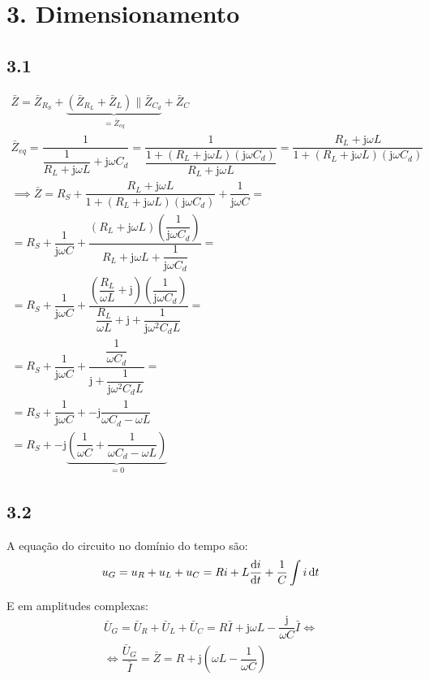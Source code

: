 \documentclass[a4paper, titlepage, portuguese]{article}
\newcommand{\eq}{\Leftrightarrow} %
\begin{document}
	\section{3. Dimensionamento}
	\subsection{3.1}
		\begin{gather*}
			\bar{Z} = \bar{Z}_{R_S} + \underbrace{(\bar{Z}_{R_L} + \bar{Z}_{L}) \parallel \bar{Z}_{C_d}}_{= \bar{Z}_{eq}} + \bar{Z}_C \\
			\bar{Z}_{eq} = \dfrac{1}{\dfrac{1}{R_L + \mathrm{j} \omega L} + \mathrm{j} \omega C_d} =
			\dfrac{1}{\dfrac{1 + (R_L + \mathrm{j} \omega L)(\mathrm{j} \omega C_d)}{R_L + \mathrm{j} \omega L}} =
			\dfrac{R_L + \mathrm{j} \omega L}{1 + (R_L + \mathrm{j} \omega L)(\mathrm{j} \omega C_d)} \\
			\implies \bar{Z} = R_S + \dfrac{R_L + \mathrm{j} \omega L}{1 + (R_L + \mathrm{j} \omega L)(\mathrm{j} \omega C_d)} + \dfrac{1}{\mathrm{j} \omega C} = \\
			= R_S + \dfrac{1}{\mathrm{j} \omega C} + \dfrac{\left(R_L + \mathrm{j} \omega L\right)\left(\dfrac{1}{\mathrm{j} \omega C_d}\right)}{R_L + \mathrm{j} \omega L + \dfrac{1}{\mathrm{j} \omega C_d}} = \\
			= R_S + \dfrac{1}{\mathrm{j} \omega C} + \dfrac{\left(\dfrac{R_L}{\omega L} + \mathrm{j}\right)\left(\dfrac{1}{\mathrm{j} \omega C_d}\right)}{\dfrac{R_L}{\omega L} + \mathrm{j} + \dfrac{1}{\mathrm{j} \omega^2 C_d L}} = \\
			= R_S + \dfrac{1}{\mathrm{j} \omega C} + \dfrac{\dfrac{1}{\omega C_d}}{\mathrm{j} + \dfrac{1}{\mathrm{j} \omega^2 C_d L}} = \\
			= R_S + \dfrac{1}{\mathrm{j} \omega C} + -\mathrm{j}\dfrac{1}{\omega C_d - \omega L} \\
			= R_S + -\mathrm{j}\underbrace{\left(\dfrac{1}{\omega C} + \dfrac{1}{\omega C_d - \omega L}\right)}_{= 0}
		\end{gather*}
	\subsection{3.2}
		\par
		A equação do circuito no domínio do tempo são:
		\begin{gather*}
			u_G = u_R + u_L + u_C = Ri + L\dv{i}{t} + \dfrac{1}{C} \int{i\dd{t}}
		\end{gather*}

		\par
		E em amplitudes complexas:
		\begin{gather*}
			\bar{U}_G = \bar{U}_R + \bar{U}_L + \bar{U}_C = R\bar{I} + \mathrm{j} \omega L - \dfrac{\mathrm{j}}{\omega C}\bar{I} \eq \\
			\eq \dfrac{\bar{U}_G}{\bar{I}} = \bar{Z} = R + \mathrm{j}(\omega L - \dfrac{1}{\omega C})
		\end{gather*}
\end{document}

